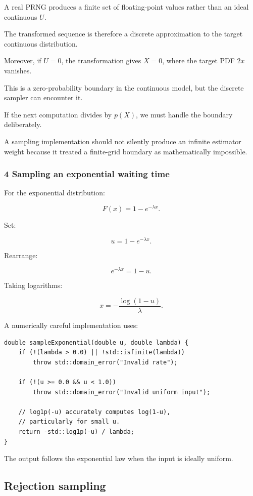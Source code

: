 A real PRNG produces a finite set of floating-point values rather than an ideal continuous \(U\).

The transformed sequence is therefore a discrete approximation to the target continuous distribution.

Moreover, if \(U=0\), the transformation gives \(X=0\), where the target PDF \(2x\) vanishes.

This is a zero-probability boundary in the continuous model, but the discrete sampler can encounter it.

If the next computation divides by \(p(X)\), we must handle the boundary deliberately.

A sampling implementation should not silently produce an infinite estimator weight because it treated a finite-grid boundary as mathematically impossible.

\subsubsection{4 Sampling an exponential waiting time}\label{02-foundations-ii-ch029-sampling-an-exponential-waiting-time}

For the exponential distribution:

\[
 F(x)=1-e^{-\lambda x}.
\]

Set:

\[
 u=1-e^{-\lambda x}.
\]

Rearrange:

\[
 e^{-\lambda x}=1-u.
\]

Taking logarithms:

\[
 \boxed{ x=-\frac{\log(1-u)}{\lambda} }.
\]

A numerically careful implementation uses:

\begin{verbatim}
double sampleExponential(double u, double lambda) {
    if (!(lambda > 0.0) || !std::isfinite(lambda))
        throw std::domain_error("Invalid rate");

    if (!(u >= 0.0 && u < 1.0))
        throw std::domain_error("Invalid uniform input");

    // log1p(-u) accurately computes log(1-u),
    // particularly for small u.
    return -std::log1p(-u) / lambda;
}
\end{verbatim}

The output follows the exponential law when the input is ideally uniform.

\subsection{Rejection sampling}\label{02-foundations-ii-ch029-rejection-sampling}

